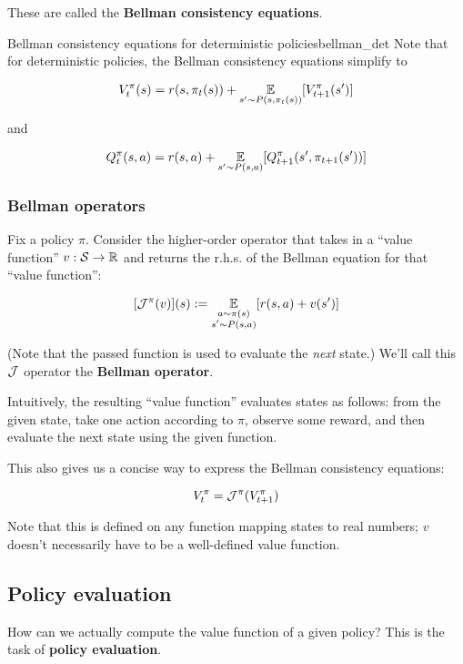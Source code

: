 \documentclass[../main/main]{subfiles}
\begin{document}
These are called the \textbf{Bellman consistency equations}.


\begin{remark}{Bellman consistency equations for deterministic policies}{bellman_det}
    Note that for deterministic policies, the Bellman consistency equations simplify to

    \[
        V_t^\pi(s) = r(s, \pi_t(s)) + \operatorname*{\mathbb{E}}_{s' \sim P(s, \pi_t(s))} [V_{t+1}^\pi(s')]
    \]

    and

    \[
        Q_t^\pi(s, a) = r(s, a) + \operatorname*{\mathbb{E}}_{s' \sim P(s, a)} [Q_{t+1}^\pi(s', \pi_{t+1}(s'))]
    \]
\end{remark}



\subsubsection{Bellman operators}

Fix a policy $\pi$. Consider the higher-order operator that takes in a ``value function'' $v : \mathcal{S} \to \mathbb{R}$ and returns the r.h.s. of the Bellman equation for that ``value function'':

\[
    [\mathcal{J}^{\pi}(v)](s) := \operatorname*{\mathbb{E}}_{\substack{a \sim \pi(s) \\ s' \sim P(s, a)}} [r(s, a) + v(s')]
\]

(Note that the passed function is used to evaluate the \emph{next} state.) We'll call this $\mathcal{J}$ operator the \textbf{Bellman operator}.

Intuitively, the resulting ``value function'' evaluates states as follows: from the given state, take one action according to $\pi$, observe some reward, and then evaluate the next state using the given function.

This also gives us a concise way to express the Bellman consistency equations:

\[
    V_t^\pi = \mathcal{J}^{\pi}(V_{t+1}^\pi)
\]

Note that this is defined on any function mapping states to real numbers; $v$ doesn't necessarily have to be a well-defined value function.


\subsection{Policy evaluation}

How can we actually compute the value function of a given policy? This is the task of \textbf{policy evaluation}.
\end{document}
